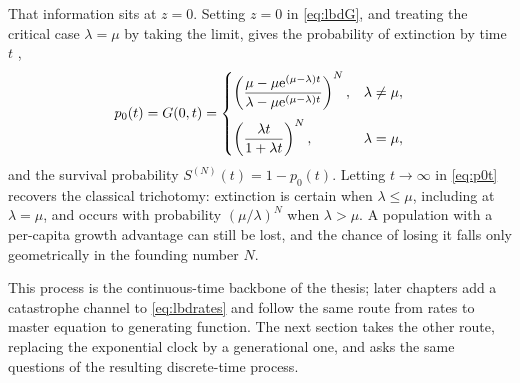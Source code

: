 That information sits at $z=0$. Setting $z=0$ in \cref{eq:lbdG}, and treating the
critical case $\lambda=\mu$ by taking the limit, gives the probability of extinction by
time $t$ \cite{Allen2010},
\begin{equation}
\label{eq:p0t}
p_0(t) = G(0,t) = \begin{cases}
\left(\dfrac{\mu - \mu{\rm e}^{(\mu-\lambda)t}}{\lambda - \mu{\rm e}^{(\mu-\lambda)t}}\right)^{N},
  & \lambda\neq\mu,\\[12pt]
\left(\dfrac{\lambda t}{1+\lambda t}\right)^{N}, & \lambda=\mu,
\end{cases}
\end{equation}
and the survival probability $S^{(N)}(t) = 1-p_0(t)$. Letting $t\to\infty$ in
\cref{eq:p0t} recovers the classical trichotomy: extinction is certain when
$\lambda\le\mu$, including at $\lambda=\mu$, and occurs with probability
$(\mu/\lambda)^N$ when $\lambda>\mu$. A population with a per-capita growth advantage
can still be lost, and the chance of losing it falls only geometrically in the founding
number $N$.

This process is the continuous-time backbone of the thesis; later chapters add a
catastrophe channel to \cref{eq:lbdrates} and follow the same route from rates to master
equation to generating function. The next section takes the other route, replacing the
exponential clock by a generational one, and asks the same questions of the resulting
discrete-time process.

\FloatBarrier
